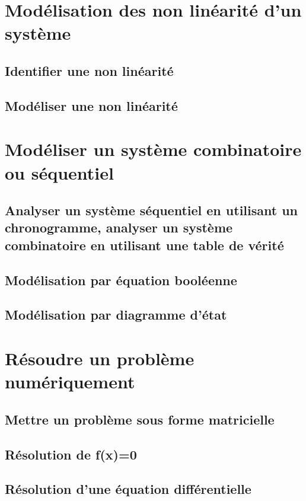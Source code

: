 \chapter{Modélisation des non linéarité d'un système} 
\section{Identifier une non linéarité} 
\clearpage 
\newpage 
\section{Modéliser une non linéarité} 
\clearpage 
\newpage 
\setchapterpreamble[u]{\margintoc} 
\chapter{Modéliser un système combinatoire ou séquentiel} 
\section{Analyser un système séquentiel en utilisant un chronogramme, analyser un système combinatoire en utilisant une table de vérité} 
\clearpage 
\newpage 
\section{Modélisation par équation booléenne} 
\clearpage 
\newpage 
\section{Modélisation par diagramme d'état} 
\clearpage 
\newpage 
\setchapterpreamble[u]{\margintoc} 
\chapter{Résoudre un problème numériquement} 
\section{Mettre un problème sous forme matricielle} 
\clearpage 
\newpage 
\section{Résolution de f(x)=0} 
\clearpage 
\newpage 
\section{Résolution d'une équation différentielle} 
\clearpage 
\newpage 
